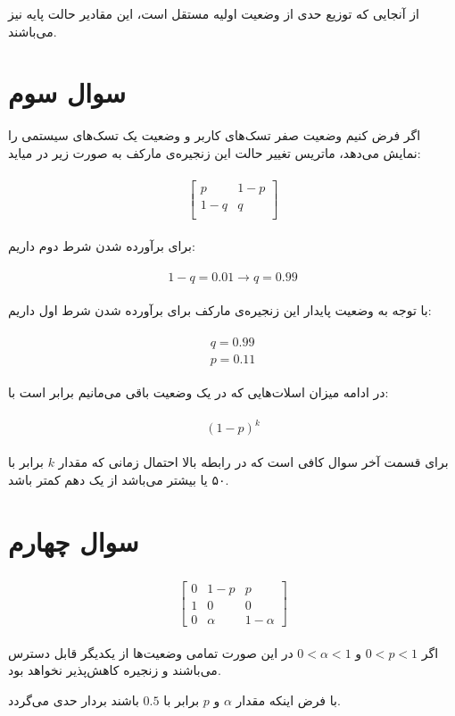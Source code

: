 \documentclass[paper=a4, fontsize=11pt]{article}
\numberwithin{equation}{section} %
\numberwithin{figure}{section} %
\numberwithin{table}{section} %
\begin{document}
از آنجایی که توزیع حدی از وضعیت اولیه مستقل است، این مقادیر حالت پایه نیز می‌باشند.

\section{سوال سوم}

اگر فرض کنیم وضعیت صفر تسک‌های کاربر و وضعیت یک تسک‌های سیستمی را نمایش می‌دهد،
ماتریس تغییر حالت این زنجیره‌ی مارکف به صورت زیر در میاید:

\begin{align}
\begin{split}
    \begin{bmatrix}
        p & 1 - p \\
        1 - q & q \\
    \end{bmatrix}
\end{split}
\end{align}

برای برآورده شدن شرط دوم داریم:

\begin{align}
\begin{split}
    1 - q = 0.01 \rightarrow q = 0.99
\end{split}
\end{align}

با توجه به وضعیت پایدار این زنجیره‌ی مارکف برای برآورده شدن شرط اول داریم:

\begin{align}
\begin{split}
   q = 0.99 \\
   p = 0.11
\end{split}
\end{align}

در ادامه میزان اسلات‌هایی که در یک وضعیت باقی می‌مانیم برابر است با:

\begin{align}
\begin{split}
    (1 - p)^k
\end{split}
\end{align}

برای قسمت آخر سوال کافی است که در رابطه بالا احتمال زمانی که مقدار \(k\)
برابر با ۵۰ یا بیشتر می‌باشد از یک دهم کمتر باشد.

\section{سوال چهارم}

\begin{align}
\begin{split}
    \begin{bmatrix}
        0 & 1 - p & p \\
        1 & 0 & 0 \\
        0 & \alpha & 1 - \alpha
    \end{bmatrix}
\end{split}
\end{align}

اگر
\( 0 < p < 1 \)
و
\( 0 < \alpha < 1 \)
در این صورت تمامی وضعیت‌ها از یکدیگر قابل دسترس می‌باشند و زنجیره کاهش‌پذیر نخواهد بود.

با فرض اینکه مقدار \(\alpha\)
و \(p\)
برابر با \(0.5\)
باشند بردار حدی 
می‌گردد.
\end{document}
